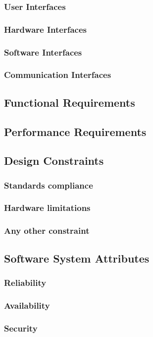 \documentclass{article}
\begin{document}
\subsubsection{User Interfaces}
\subsubsection{Hardware Interfaces}
\subsubsection{Software Interfaces}
\subsubsection{Communication Interfaces}
\subsection{Functional Requirements}
\subsection{Performance Requirements}
\subsection{Design Constraints}
\subsubsection{Standards compliance}
\subsubsection{Hardware limitations}
\subsubsection{Any other constraint}
\subsection{Software System Attributes}
\subsubsection{Reliability}
\subsubsection{Availability}
\subsubsection{Security}
\end{document}
